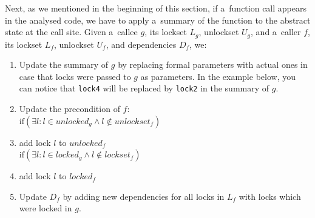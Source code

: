 \documentclass{ExcelAtFIT}
\begin{document}
Next, as we mentioned in the beginning of this section, if a~function call appears in the analysed code, we have to apply a~summary of the function to the abstract state at the call site. Given a~callee $g$, its lockset $L_g$, unlockset $U_g$, and a~caller $f$, its lockset $L_f$, unlockset $U_f$, and dependencies $D_f$, we:
\begin{enumerate}[label={(\arabic*)}, wide=0pt, listparindent=1.25em, parsep=0pt, topsep=0.4em]
    \item Update the summary of $g$ by replacing formal parameters with actual ones in case that locks were passed to $g$ as parameters. In the example below, you can notice that \texttt{lock4} will be replaced by \texttt{lock2} in the summary of $g$.
    \item Update the precondition of $f$:\\
$\mathrm{if}(\exists l: l\in unlocked_{g}\wedge l\notin unlockset_{f})$
    \item[]\hspace{20pt}add lock $l$ to $unlocked_{f}$\\
$\mathrm{if}(\exists l: l\in locked_{g}\wedge l\notin lockset_{f})$
    \item[]\hspace{20pt}add lock $l$ to $locked_{f}$
    \item Update $D_f$ by adding new dependencies for all locks in $L_f$ with locks which were locked in $g$.


\end{enumerate}
\end{document}
